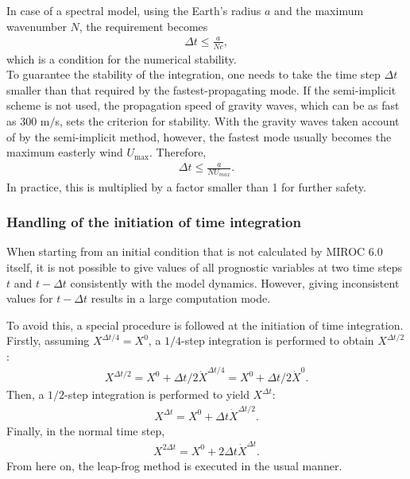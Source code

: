 In case of a spectral model, using the Earth's radius \(a\) and the
maximum wavenumber \(N\), the requirement becomes
\begin{eqnarray}
   \Delta t \le \frac{a}{N c},
\end{eqnarray}
which is a condition for the numerical stability.\\

To guarantee the stability of the integration, one needs to take the time step  \(\Delta t\) smaller than that required by the fastest-propagating mode.
If the semi-implicit scheme is not used, the propagation speed of gravity waves, which can be as fast as 300 m$/$s, sets the criterion for stability.
With the gravity waves taken account of by the semi-implicit method, however, the fastest mode usually becomes the maximum easterly wind $U_{\mathrm{max}}$. Therefore,
\begin{eqnarray}
   \Delta t \le \frac{a}{N U_{max}} .
\end{eqnarray}
In practice, this is multiplied by a factor smaller than 1 for further safety.

\hypertarget{handling-of-the-initiation-of-time-integration}{%
\subsubsection{Handling of the initiation of time
integration}\label{handling-of-the-initiation-of-time-integration}}

When starting from an initial condition that is not calculated by
MIROC 6.0 itself, it is not possible to give values of all prognostic variables at two time steps \(t\)
and \(t-\Delta t\) consistently with the model dynamics.
However, giving inconsistent values for \(t-\Delta t\) results in a large computation mode.

To avoid this, a special procedure is followed at the initiation of time integration.
Firstly, assuming \(X^{\Delta t/4} = X^0\), a \(1/4\)-step integration is performed to obtain $X^{\Delta t/2}$:
\begin{eqnarray}
  X^{\Delta t/2} = X^0 + \Delta t/2 \dot{X}^{\Delta t/4}
                 = X^0 + \Delta t/2 \dot{X}^0.
\end{eqnarray}
Then, a \(1/2\)-step integration is performed to yield $X^{\Delta t}$:
\begin{eqnarray}
  X^{\Delta t}   = X^0 + \Delta t \dot{X}^{\Delta t/2}.
\end{eqnarray}
Finally, in the normal time step,
\begin{eqnarray}
  X^{2\Delta t}   = X^0 + 2 \Delta t \dot{X}^{\Delta t}.
\end{eqnarray}
From here on, the leap-frog method is executed in the usual manner.
